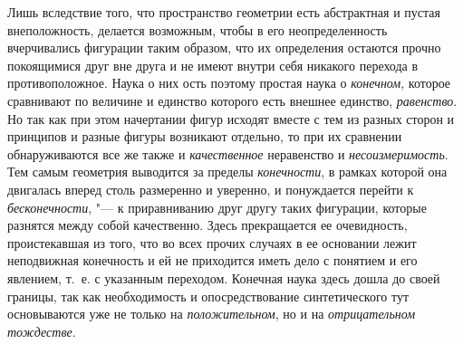 Лишь вследствие того, что пространство геометрии есть
абстрактная и пустая внеположность, делается возможным, чтобы в
его неопределенность вчерчивались фигурации таким образом,
что их определения остаются прочно покоящимися друг вне друга и не имеют
внутри себя никакого перехода в противоположное. Наука о них ость поэтому
простая наука о {\em конечном},
которое сравнивают по величине и единство которого есть
внешнее единство, {\em равенство}.
Но так как при этом начертании фигур исходят вместе с тем из
разных сторон и принципов и разные фигуры возникают отдельно, то при их
сравнении обнаруживаются все же также и
{\em качественное}
неравенство и
{\em несоизмеримость}.
Тем самым геометрия выводится за пределы
{\em конечности}, в
рамках которой она двигалась вперед столь размеренно и уверенно, и
понуждается перейти к
{\em бесконечности}, "--- к
приравниванию друг другу таких фигурации, которые разнятся между собой
качественно. Здесь прекращается ее очевидность, проистекавшая из того, что
во всех прочих случаях в ее основании лежит неподвижная конечность и ей не
приходится иметь дело с понятием и его явлением, т.~е. с указанным
переходом. Конечная наука здесь дошла до своей границы, так как
необходимость и опосредствование синтетического тут основываются уже не
только на {\em положительном}, но и на {\em отрицательном тождестве}.

